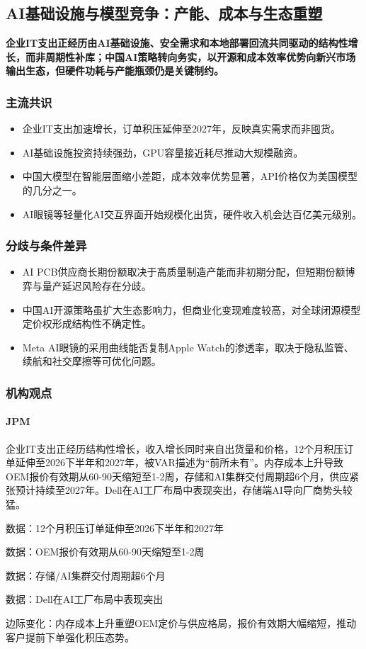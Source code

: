 \documentclass[11pt]{ctexart}
\begin{document}
\subsection{AI基础设施与模型竞争：产能、成本与生态重塑}
\textbf{企业IT支出正经历由AI基础设施、安全需求和本地部署回流共同驱动的结构性增长，而非周期性补库；中国AI策略转向务实，以开源和成本效率优势向新兴市场输出生态，但硬件功耗与产能瓶颈仍是关键制约。}
\subsubsection*{主流共识}
\begin{itemize}
  \item 企业IT支出加速增长，订单积压延伸至2027年，反映真实需求而非囤货。
  \item AI基础设施投资持续强劲，GPU容量接近耗尽推动大规模融资。
  \item 中国大模型在智能层面缩小差距，成本效率优势显著，API价格仅为美国模型的几分之一。
  \item AI眼镜等轻量化AI交互界面开始规模化出货，硬件收入机会达百亿美元级别。
\end{itemize}
\subsubsection*{分歧与条件差异}
\begin{itemize}
  \item AI PCB供应商长期份额取决于高质量制造产能而非初期分配，但短期份额博弈与量产延迟风险存在分歧。
  \item 中国AI开源策略虽扩大生态影响力，但商业化变现难度较高，对全球闭源模型定价权形成结构性不确定性。
  \item Meta AI眼镜的采用曲线能否复制Apple Watch的渗透率，取决于隐私监管、续航和社交摩擦等可优化问题。
\end{itemize}
\subsubsection*{机构观点}
\paragraph{JPM} 企业IT支出正经历结构性增长，收入增长同时来自出货量和价格，12个月积压订单延伸至2026下半年和2027年，被VAR描述为“前所未有”。内存成本上升导致OEM报价有效期从60-90天缩短至1-2周，存储和AI集群交付周期超6个月，供应紧张预计持续至2027年。Dell在AI工厂布局中表现突出，存储端AI导向厂商势头较猛。
{\small\color{refgray}数据：12个月积压订单延伸至2026下半年和2027年\par}
{\small\color{refgray}数据：OEM报价有效期从60-90天缩短至1-2周\par}
{\small\color{refgray}数据：存储/AI集群交付周期超6个月\par}
{\small\color{refgray}数据：Dell在AI工厂布局中表现突出\par}
{\small\color{refgray}边际变化：内存成本上升重塑OEM定价与供应格局，报价有效期大幅缩短，推动客户提前下单强化积压态势。\par}
\end{document}
